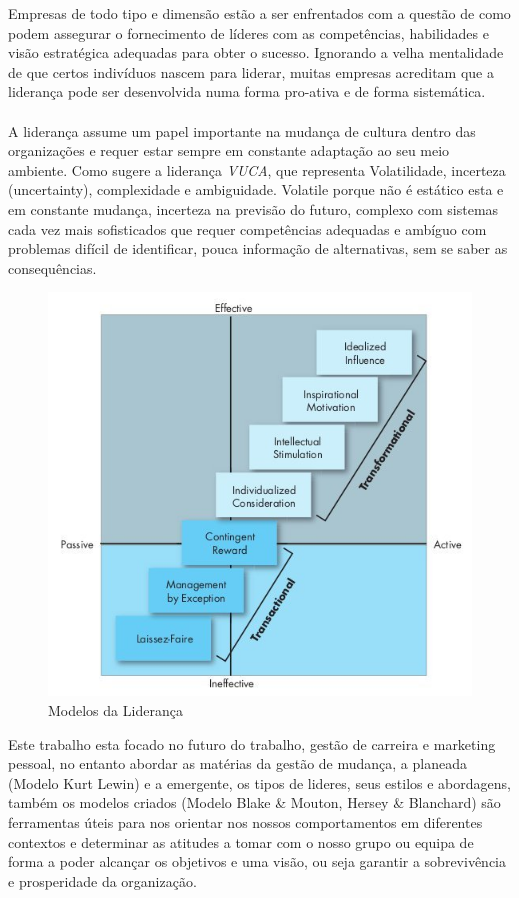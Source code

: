 Empresas de todo tipo e dimensão estão a ser enfrentados com a questão de como podem assegurar o fornecimento de líderes com as competências, habilidades e visão estratégica adequadas para obter o sucesso. Ignorando a velha mentalidade de que certos indivíduos nascem para liderar, muitas empresas acreditam que a liderança pode ser desenvolvida numa forma pro-ativa e de forma sistemática. \cite{book_6}\\
\\
A liderança assume um papel importante na mudança de cultura dentro das organizações e requer estar sempre em constante adaptação ao seu meio ambiente. Como sugere a liderança \textit{VUCA}, que representa Volatilidade, incerteza (uncertainty), complexidade e ambiguidade. Volatile porque não é estático esta e em constante mudança, incerteza na previsão do futuro, complexo com sistemas cada vez mais sofisticados que requer competências adequadas e ambíguo com problemas difícil de identificar, pouca informação de alternativas, sem se saber as consequências.
\begin{figure}[H]
	\centering
	\includegraphics[scale=0.52]{./image/Leadership/Leadership_Models.jpg}
	\caption{Modelos da Liderança \cite{book_2}}
\end{figure}
Este trabalho esta focado no futuro do trabalho, gestão de carreira e marketing pessoal, no entanto abordar as matérias da gestão de mudança, a planeada (Modelo Kurt Lewin) e a emergente, os tipos de lideres, seus estilos e abordagens, também os modelos criados (Modelo Blake \& Mouton, Hersey \& Blanchard) são ferramentas úteis para nos orientar nos nossos comportamentos em diferentes contextos e determinar as atitudes a tomar com o nosso grupo ou equipa de forma a poder alcançar os objetivos e uma visão, ou seja garantir a sobrevivência e prosperidade da organização.
